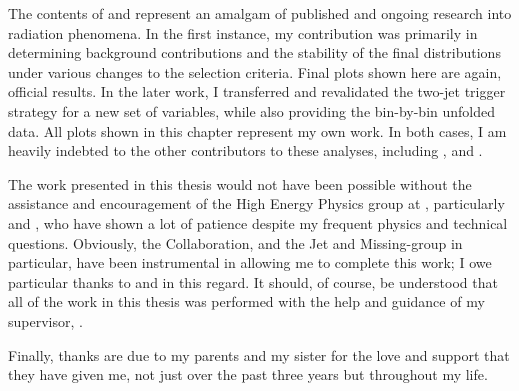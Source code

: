 The contents of  and 
represent an amalgam of published and ongoing research into \QCD radiation
phenomena. In the first instance, my contribution was primarily in determining
background contributions and the stability of the final distributions under
various changes to the selection criteria. Final plots shown here are again,
official \ATLAS results. In the later work, I transferred and revalidated the
two-jet trigger strategy for a new set of variables, while also providing the
bin-by-bin unfolded data. All plots shown in this chapter represent my own work.
In both cases, I am heavily indebted to the other contributors to these analyses,
including \personAP, \personPB and \personGB.

The work presented in this thesis would not have been possible without the
assistance and encouragement of the High Energy Physics group at \UCL,
particularly \personAD and \personJM, who have shown a lot of patience despite
my frequent physics and technical questions. Obviously, the \ATLAS
Collaboration, and the Jet and Missing-\ET group in particular, have been
instrumental in allowing me to complete this work; I owe particular thanks to
\personAP and \personDG in this regard. It should, of course, be understood that
all of the work in this thesis was performed with the help and guidance of my
supervisor, \personMC.

Finally, thanks are due to my parents and my sister for the love and support
that they have given me, not just over the past three years but throughout my
life.
